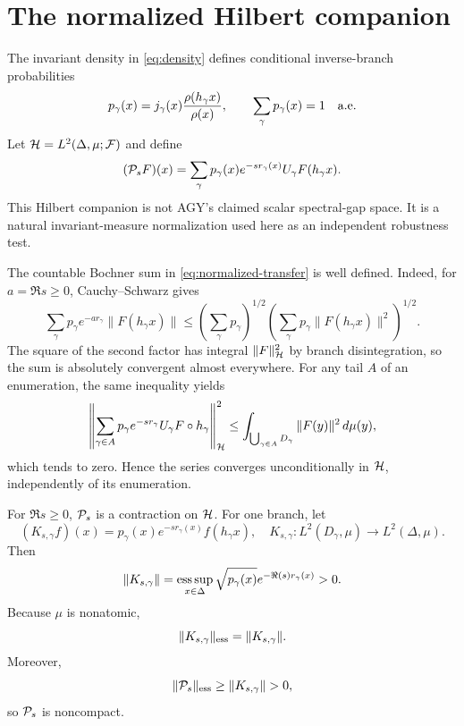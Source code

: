 \section{The normalized Hilbert companion}
\label{sec:l2}

The invariant density in \eqref{eq:density} defines conditional
inverse-branch probabilities
\begin{equation}
 p_\gamma(x)=j_\gamma(x)\frac{\rho(h_\gamma x)}{\rho(x)},
 \qquad
 \sum_\gamma p_\gamma(x)=1
 \quad\hbox{a.e.}
 \label{eq:branch-probabilities}
\end{equation}
Let \(\mathcal H=L^2(\Delta,\mu;\mathcal F)\) and define
\begin{equation}
 (\mathcal P_sF)(x)=\sum_\gamma p_\gamma(x)e^{-sr_\gamma(x)}
 U_\gamma F(h_\gamma x).
 \label{eq:normalized-transfer}
\end{equation}
This Hilbert companion is not AGY's claimed scalar spectral-gap space.  It
is a natural invariant-measure normalization used here as an independent
robustness test.

The countable Bochner sum in \eqref{eq:normalized-transfer} is well defined.
Indeed, for \(a=\Re s\ge0\), Cauchy--Schwarz gives
\begin{equation}
 \sum_\gamma p_\gamma e^{-ar_\gamma}\|F(h_\gamma x)\|
 \le
 \left(\sum_\gamma p_\gamma\right)^{1/2}
 \left(\sum_\gamma p_\gamma\|F(h_\gamma x)\|^2\right)^{1/2}.
 \label{eq:bochner-bound}
\end{equation}
The square of the second factor has integral \(\|F\|_{\mathcal H}^2\) by branch
disintegration, so the sum is absolutely convergent almost everywhere.
For any tail \(A\) of an enumeration, the same inequality yields
\[
 \left\|\sum_{\gamma\in A}p_\gamma e^{-sr_\gamma}
 U_\gamma F\circ h_\gamma\right\|_{\mathcal H}^2
 \le \int_{\bigcup_{\gamma\in A}D_\gamma}\|F(y)\|^2\,d\mu(y),
\]
which tends to zero.  Hence the series converges unconditionally in
\(\mathcal H\), independently of its enumeration.

\begin{theorem}
\label{thm:l2-branch}
For \(\Re s\ge0\), \(\mathcal P_s\) is a contraction on \(\mathcal H\).  For one branch,
let
\[
 (K_{s,\gamma}f)(x)
 =p_\gamma(x)e^{-sr_\gamma(x)}f(h_\gamma x),
 \quad
 K_{s,\gamma}:L^2(D_\gamma,\mu)\to L^2(\Delta,\mu).
\]
Then
\begin{equation}
 \|K_{s,\gamma}\|
 =\operatorname*{ess\,sup}_{x\in\Delta}
  \sqrt{p_\gamma(x)}e^{-\Re(s)r_\gamma(x)}>0.
 \label{eq:branch-norm}
\end{equation}
Because \(\mu\) is nonatomic,
\begin{equation}
 \|K_{s,\gamma}\|_{\mathrm{ess}}=\|K_{s,\gamma}\|.
 \label{eq:scalar-branch-essential}
\end{equation}
Moreover,
\begin{equation}
 \|\cP_s\|_{\ess}\ge\|K_{s,\gamma}\|>0,
 \label{eq:l2-essential}
\end{equation}
so \(\mathcal P_s\) is noncompact.
\end{theorem}

